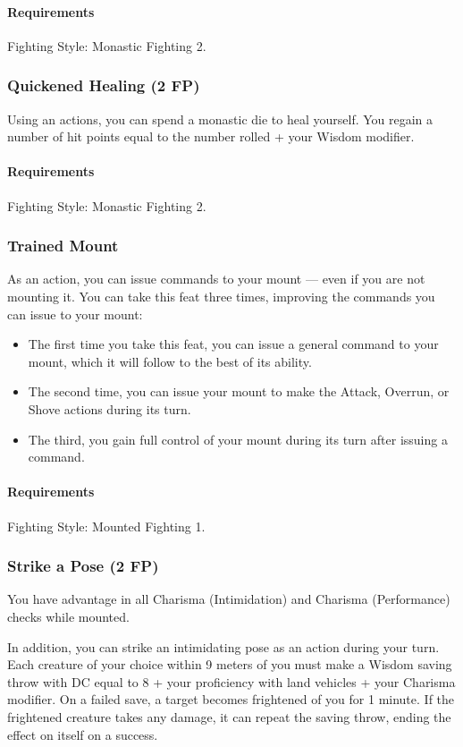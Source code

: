     \paragraph{Requirements} Fighting Style: Monastic Fighting 2.
\subsubsection{Quickened Healing (2 FP)} \label{feat::quickenedhealing}
    Using an actions, you can spend a monastic die to heal yourself.
    You regain a number of hit points equal to the number rolled + your Wisdom modifier.
    \paragraph{Requirements} Fighting Style: Monastic Fighting 2.
\subsubsection{Trained Mount} \label{feat::trainedmount}
    As an action, you can issue commands to your mount --- even if you are not mounting it.
    You can take this feat three times, improving the commands you can issue to your mount:
    \begin{itemize}
        \item The first time you take this feat, you can issue a general command to your mount, which it will follow to the best of its ability.
        \item The second time, you can issue your mount to make the Attack, Overrun, or Shove actions during its turn.
        \item The third, you gain full control of your mount during its turn after issuing a command.
    \end{itemize}
    \paragraph{Requirements} Fighting Style: Mounted Fighting 1.
\subsubsection{Strike a Pose (2 FP)} \label{feat::strikeapose}
    You have advantage in all Charisma (Intimidation) and Charisma (Performance) checks while mounted.

    In addition, you can strike an intimidating pose as an action during your turn.
    Each creature of your choice within 9 meters of you must make a Wisdom saving throw with DC equal to 8 + your proficiency with land vehicles + your Charisma modifier.
    On a failed save, a target becomes frightened of you for 1 minute.
    If the frightened creature takes any damage, it can repeat the saving throw, ending the effect on itself on a success.

